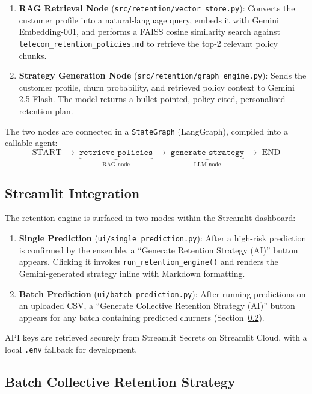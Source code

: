 \documentclass[12pt,a4paper]{article}
\begin{document}
\begin{enumerate}[leftmargin=2em]
    \item \textbf{RAG Retrieval Node} (\texttt{src/retention/vector\_store.py}): Converts the customer profile into a natural-language query, embeds it with Gemini Embedding-001, and performs a FAISS cosine similarity search against \texttt{telecom\_retention\_policies.md} to retrieve the top-2 relevant policy chunks.
    \item \textbf{Strategy Generation Node} (\texttt{src/retention/graph\_engine.py}): Sends the customer profile, churn probability, and retrieved policy context to Gemini 2.5 Flash. The model returns a bullet-pointed, policy-cited, personalised retention plan.
\end{enumerate}

The two nodes are connected in a \texttt{StateGraph} (LangGraph), compiled into a callable agent:
\[
\text{START} \;\rightarrow\; \underbrace{\texttt{retrieve\_policies}}_\text{RAG node} \;\rightarrow\; \underbrace{\texttt{generate\_strategy}}_\text{LLM node} \;\rightarrow\; \text{END}
\]

\subsection{Streamlit Integration}

The retention engine is surfaced in two modes within the Streamlit dashboard:

\begin{enumerate}[leftmargin=2em]
    \item \textbf{Single Prediction} (\texttt{ui/single\_prediction.py}): After a high-risk prediction is confirmed by the ensemble, a ``Generate Retention Strategy (AI)'' button appears. Clicking it invokes \texttt{run\_retention\_engine()} and renders the Gemini-generated strategy inline with Markdown formatting.
    \item \textbf{Batch Prediction} (\texttt{ui/batch\_prediction.py}): After running predictions on an uploaded CSV, a ``Generate Collective Retention Strategy (AI)'' button appears for any batch containing predicted churners (Section~\ref{sec:batch-retention}).
\end{enumerate}

API keys are retrieved securely from Streamlit Secrets on Streamlit Cloud, with a local \texttt{.env} fallback for development.

\subsection{Batch Collective Retention Strategy}
\label{sec:batch-retention}
\end{document}
